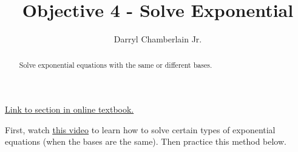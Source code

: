 \documentclass{ximera}
\author{Darryl Chamberlain Jr.}
\title{Objective 4 - Solve Exponential}
\begin{document}
\begin{abstract}
Solve exponential equations with the same or different bases.
\end{abstract}
\maketitle

\href{https://cnx.org/contents/mwjClAV_@8.1:wfhkHyEh@11/Exponential-and-Logarithmic-Equations}{Link to section in online textbook.}


First, watch 
\underline{\href{https://mediasite.video.ufl.edu/Mediasite/Play/a70362f0ebae4b12a37022c13921532c1d}{this video}} to learn how to solve certain types of exponential equations (when the bases are the same). Then practice this method below.
\end{document}
